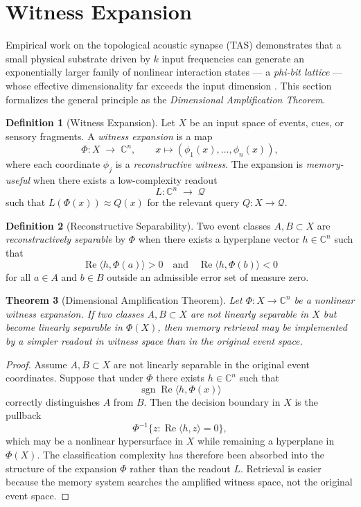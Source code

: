 \documentclass[12pt, oneside]{book}
\theoremstyle{plain}
\newtheorem{theorem}{Theorem}[chapter]
\theoremstyle{definition}
\newtheorem{definition}[theorem]{Definition}
\theoremstyle{remark}
\DeclareMathOperator{\sgn}{sgn}
\newcommand{\calQ}{\mathcal{Q}}
\newcommand{\CC}{\mathbb{C}}
\begin{document}
\section{Witness Expansion}

Empirical work on the topological acoustic synapse (TAS)
demonstrates that a small physical substrate driven by
$k$ input frequencies can generate an exponentially larger
family of nonlinear interaction states --- a
\emph{phi-bit lattice} --- whose effective dimensionality
far exceeds the input dimension \cite{Chen2026TAS}.
This section formalizes the general principle as the
\emph{Dimensional Amplification Theorem}.

\begin{definition}[Witness Expansion]
\label{def:witness-expansion}
Let $X$ be an input space of events, cues, or sensory
fragments.
A \emph{witness expansion} is a map
\[
  \Phi : X \;\longrightarrow\; \CC^n,
  \qquad x \mapsto (\phi_1(x), \ldots, \phi_n(x)),
\]
where each coordinate $\phi_j$ is a \emph{reconstructive
witness}.
The expansion is \emph{memory-useful} when there exists
a low-complexity readout
\[
  L : \CC^n \;\longrightarrow\; \calQ
\]
such that $L(\Phi(x)) \approx Q(x)$ for the relevant
query $Q : X \to \calQ$.
\end{definition}

\begin{definition}[Reconstructive Separability]
Two event classes $A, B \subset X$ are
\emph{reconstructively separable} by $\Phi$ when there
exists a hyperplane vector $h \in \CC^n$ such that
\[
  \operatorname{Re}\langle h, \Phi(a)\rangle > 0
  \quad\text{and}\quad
  \operatorname{Re}\langle h, \Phi(b)\rangle < 0
\]
for all $a \in A$ and $b \in B$ outside an admissible
error set of measure zero.
\end{definition}

\begin{theorem}[Dimensional Amplification Theorem]
\label{thm:dim-amp}
Let $\Phi : X \to \CC^n$ be a nonlinear witness expansion.
If two classes $A, B \subset X$ are not linearly separable
in $X$ but become linearly separable in $\Phi(X)$,
then memory retrieval may be implemented by a simpler
readout in witness space than in the original event space.
\end{theorem}

\begin{proof}
Assume $A, B \subset X$ are not linearly separable in
the original event coordinates.
Suppose that under $\Phi$ there exists $h \in \CC^n$
such that
\[
  \sgn\!\operatorname{Re}\langle h, \Phi(x)\rangle
\]
correctly distinguishes $A$ from $B$.
Then the decision boundary in $X$ is the pullback
\[
  \Phi^{-1}\{z : \operatorname{Re}\langle h, z\rangle = 0\},
\]
which may be a nonlinear hypersurface in $X$ while remaining
a hyperplane in $\Phi(X)$.
The classification complexity has therefore been absorbed
into the structure of the expansion $\Phi$ rather than
the readout $L$.
Retrieval is easier because the memory system searches
the amplified witness space, not the original event space.
\end{proof}
\end{document}
